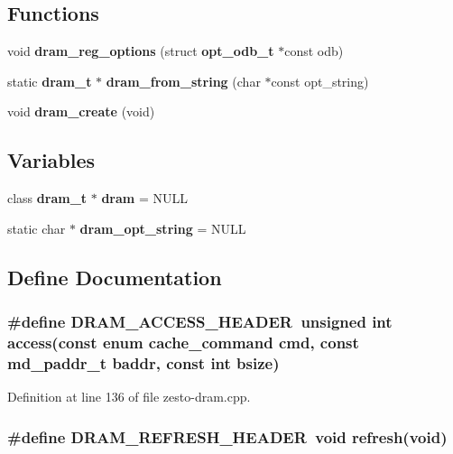\subsection*{Functions}
\begin{CompactItemize}
\item 
void {\bf dram\_\-reg\_\-options} (struct {\bf opt\_\-odb\_\-t} $\ast$const odb)
\item 
static {\bf dram\_\-t} $\ast$ {\bf dram\_\-from\_\-string} (char $\ast$const opt\_\-string)
\item 
void {\bf dram\_\-create} (void)
\end{CompactItemize}
\subsection*{Variables}
\begin{CompactItemize}
\item 
class {\bf dram\_\-t} $\ast$ {\bf dram} = NULL
\item 
static char $\ast$ {\bf dram\_\-opt\_\-string} = NULL
\end{CompactItemize}


\subsection{Define Documentation}
\subsubsection[{DRAM\_\-ACCESS\_\-HEADER}]{\setlength{\rightskip}{0pt plus 5cm}\#define DRAM\_\-ACCESS\_\-HEADER~unsigned int access(const enum {\bf cache\_\-command} cmd, const {\bf md\_\-paddr\_\-t} baddr, const int bsize)}\label{zesto-dram_8cpp_f8932b1913307b1cef1464b5be2cc03e}




Definition at line 136 of file zesto-dram.cpp.
\subsubsection[{DRAM\_\-REFRESH\_\-HEADER}]{\setlength{\rightskip}{0pt plus 5cm}\#define DRAM\_\-REFRESH\_\-HEADER~void refresh(void)}\label{zesto-dram_8cpp_0356ca9fc99346b3b3008c3df0b8050e}




